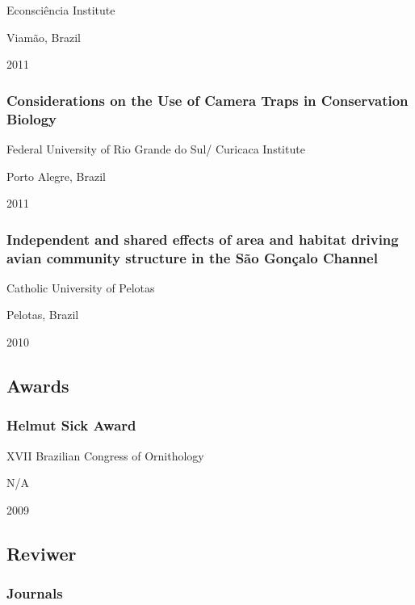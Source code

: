 \documentclass[
]{article}
\begin{document}
Econsciência Institute

Viamão, Brazil

2011

\hypertarget{considerations-on-the-use-of-camera-traps-in-conservation-biology}{%
\subsubsection{Considerations on the Use of Camera Traps in Conservation
Biology}\label{considerations-on-the-use-of-camera-traps-in-conservation-biology}}

Federal University of Rio Grande do Sul/ Curicaca Institute

Porto Alegre, Brazil

2011

\hypertarget{independent-and-shared-effects-of-area-and-habitat-driving-avian-community-structure-in-the-suxe3o-gonuxe7alo-channel}{%
\subsubsection{Independent and shared effects of area and habitat
driving avian community structure in the São Gonçalo
Channel}\label{independent-and-shared-effects-of-area-and-habitat-driving-avian-community-structure-in-the-suxe3o-gonuxe7alo-channel}}

Catholic University of Pelotas

Pelotas, Brazil

2010

\hypertarget{awards}{%
\subsection{Awards}\label{awards}}

\hypertarget{helmut-sick-award}{%
\subsubsection{Helmut Sick Award}\label{helmut-sick-award}}

XVII Brazilian Congress of Ornithology

N/A

2009

\hypertarget{reviwer}{%
\subsection{Reviwer}\label{reviwer}}

\hypertarget{journals}{%
\subsubsection{Journals}\label{journals}}
\end{document}
